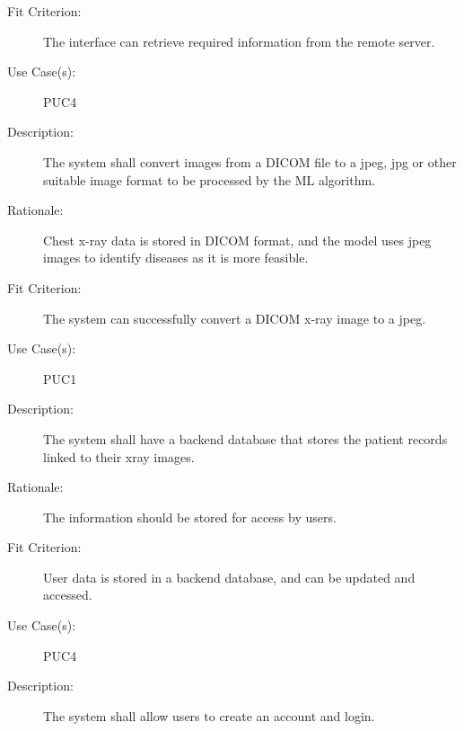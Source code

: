 \documentclass[12pt]{article}
\begin{document}
\begin{enumerate}[label=FR\arabic*., series=frs]
\begin{item}
\begin{description}
            \item[Fit Criterion:] The interface can retrieve required information from the remote server.
            \item[Use Case(s):] PUC4
        \end{description}
    \end{item}
     \begin{item}
         \begin{description}
             \item[Description:] The system shall convert images from a DICOM file to a jpeg, jpg or other suitable image format to be processed by the ML algorithm.
             \item[Rationale:] Chest x-ray data is stored in DICOM format, and the model uses jpeg images to identify diseases as it is more feasible.
             \item[Fit Criterion:] The system can successfully convert a DICOM x-ray image to a jpeg.
             \item[Use Case(s):] PUC1
         \end{description}
     \end{item}
    \begin{item}
        \begin{description}
            \item[Description:] The system shall have a backend database that stores the patient records linked to their xray images.
            \item[Rationale:] The information should be stored for access by users.
            \item[Fit Criterion:] User data is stored in a backend database, and can be updated and accessed.
            \item[Use Case(s):] PUC4
        \end{description}
    \end{item}
    \begin{item}
        \begin{description}
            \item[Description:] The system shall allow users to create an account and login.

\end{description}
\end{item}
\end{enumerate}
\end{document}
